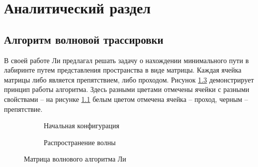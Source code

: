 \chapter{Аналитический раздел}\label{sec:analyth}

\section{Алгоритм волновой трассировки}

В своей работе Ли \cite{lee-orig} предлагал решать задачу о нахождении минимального пути в лабиринте путем представления пространства в виде матрицы. Каждая ячейка матрицы либо является препятствием, либо проходом. Рисунок \ref{fig:lee} демонстрирует принцип работы алгоритма. Здесь разными цветами отмечены ячейки с разными свойствами -- на рисунке \ref{fig:maze-init} белым цветом отмечена ячейка -- проход, черным -- препятствие. 

\begin{figure}[H]
	\captionsetup{singlelinecheck = false, justification=centering}
	\begin{subfigure}[b]{0.5\textwidth}
	\caption{Начальная конфигурация}
	\label{fig:maze-init}

	\end{subfigure}
	\begin{subfigure}[b]{0.5\textwidth}
	\caption{Распространение волны}
	\label{fig:maze-wave}
\end{subfigure}
\caption{Матрица волнового алгоритма Ли}
\label{fig:lee}
\end{figure}


